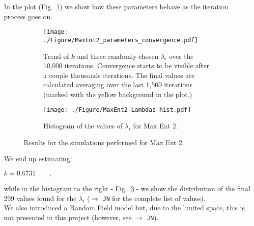 \documentclass[a4paper,11pt]{article}
\begin{document}
In the plot (Fig.~\ref{fig:MaxEnt2_parameters}) we show how these parameters behave as the iteration process goes on.
\begin{figure}[htp]
\centering
\begin{subfigure}[t]{0.49\textwidth}
 \centering
    \texttt{[image: ./Figure/MaxEnt2\_parameters\_convergence.pdf]}
    \caption{Trend of $k$ and three randomly-chosen $\lambda_i$ over the 10,000 iterations. Convergence starts to be visible after a couple thousands iterations. The final values are calculated averaging over the last 1,500 iterations (marked with the yellow background in the plot.)}
    \label{fig:MaxEnt2_parameters}
\end{subfigure}
\begin{subfigure}[t]{0.49\textwidth}
\centering
    \texttt{[image: ./Figure/MaxEnt2\_Lambdas\_hist.pdf]}
    \caption{Histogram of the values of $\lambda_i$ for Max Ent 2.}
    \label{fig:maxent2lambda}
\end{subfigure}
\caption{Results for the simulations performed for Max Ent 2.}
\end{figure}
We end up estimating:
\begin{center}
    $k=0.6731 \qquad ,$
\end{center}
while in the histogram to the right - Fig.~\ref{fig:maxent2lambda} - we show the distribution of the final 299 values found for the $\lambda_i$ ($\Rightarrow$ \texttt{JN} for the complete list of values). 
\\
We also introduced a Random Field model but, due to the limited space, this is not presented in this project (however, see $\Rightarrow$ \texttt{JN}).

\end{document}
